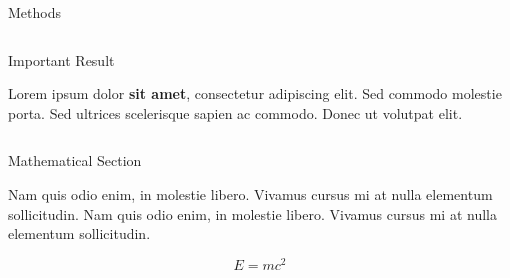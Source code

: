 \documentclass[final]{beamer}
\newlength{\onecolwid}
\newlength{\twocolwid}
\begin{document}
\begin{frame}[t]
\begin{columns}[t]
\begin{column}{\twocolwid}
\begin{columns}[t,totalwidth=\twocolwid]
\begin{column}{\onecolwid}
\begin{block}{Methods}
\end{block}


\end{column} %

\end{columns} %



\begin{alertblock}{Important Result}

Lorem ipsum dolor \textbf{sit amet}, consectetur adipiscing elit. Sed commodo molestie porta. Sed ultrices scelerisque sapien ac commodo. Donec ut volutpat elit.

\end{alertblock} 


\begin{columns}[t,totalwidth=\twocolwid] %

\begin{column}{\onecolwid} %


\begin{block}{Mathematical Section}

Nam quis odio enim, in molestie libero. Vivamus cursus mi at nulla elementum sollicitudin. Nam quis odio enim, in molestie libero. Vivamus cursus mi at nulla elementum sollicitudin.
  
\begin{equation}
E = mc^{2}
\label{eqn:Einstein}
\end{equation}


\end{block}
\end{column}
\end{columns}
\end{column}
\end{columns}
\end{frame}
\end{document}
